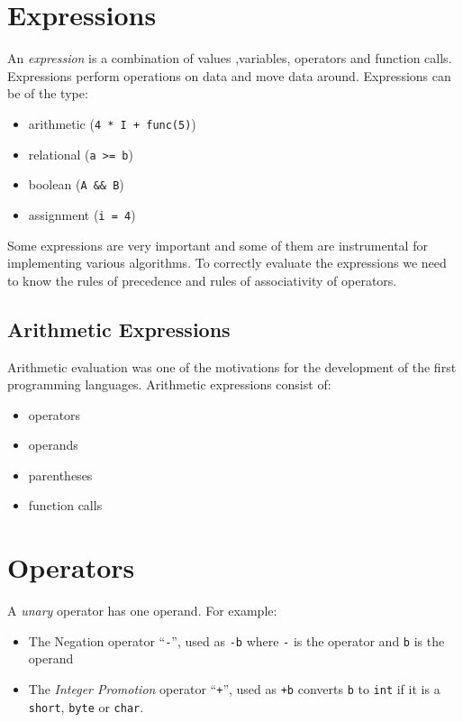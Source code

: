 
\section{Expressions}
An \textit{expression} is a combination of values ,variables, operators and function calls. Expressions perform operations on data and move data around. Expressions can be of the type:
\begin{itemize}
    \item arithmetic (\verb|4 * I + func(5)|)
    \item relational (\verb|a >= b|)
    \item boolean (\verb|A && B|)
    \item assignment (\verb|i = 4|)
\end{itemize}

Some expressions are very important and some of them are instrumental for implementing various algorithms. To correctly evaluate the expressions we need to know the rules of precedence and rules of associativity of operators.

\subsection{Arithmetic Expressions}
Arithmetic evaluation was one of the motivations for the development of the first programming languages. Arithmetic expressions consist of:
\begin{itemize}
    \item operators
    \item operands
    \item parentheses
    \item function calls
\end{itemize}

\section{Operators}
A \textit{unary} operator has one operand. For example:
\begin{itemize}
    \item The Negation operator ``\verb|-|'', used as \verb|-b| where \verb|-| is the operator and \verb|b| is the operand
    \item The \textit{Integer Promotion} operator ``\verb|+|'', used as \verb|+b| converts \verb|b| to \verb|int| if it is a \verb|short|, \verb|byte| or \verb|char|. 
\end{itemize}

